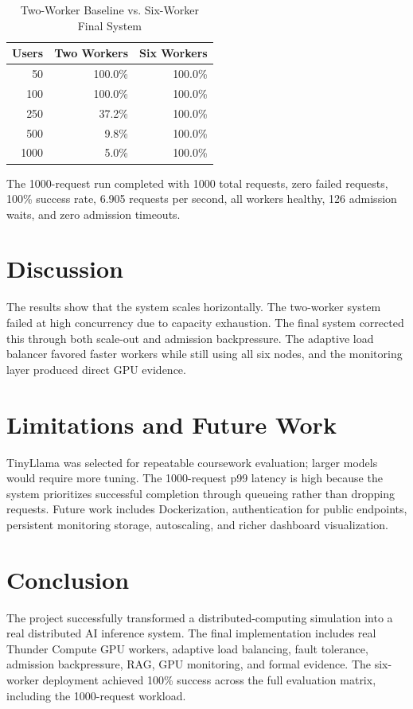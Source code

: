 \documentclass[conference]{IEEEtran}
\begin{document}
\begin{table}[h]
\caption{Two-Worker Baseline vs. Six-Worker Final System}
\centering
\begin{tabular}{rrr}
\toprule
Users & Two Workers & Six Workers \\
\midrule
50 & 100.0\% & 100.0\% \\
100 & 100.0\% & 100.0\% \\
250 & 37.2\% & 100.0\% \\
500 & 9.8\% & 100.0\% \\
1000 & 5.0\% & 100.0\% \\
\bottomrule
\end{tabular}
\end{table}

The 1000-request run completed with 1000 total requests, zero failed requests, 100\% success rate, 6.905 requests per second, all workers healthy, 126 admission waits, and zero admission timeouts.

\section{Discussion}
The results show that the system scales horizontally. The two-worker system failed at high concurrency due to capacity exhaustion. The final system corrected this through both scale-out and admission backpressure. The adaptive load balancer favored faster workers while still using all six nodes, and the monitoring layer produced direct GPU evidence.

\section{Limitations and Future Work}
TinyLlama was selected for repeatable coursework evaluation; larger models would require more tuning. The 1000-request p99 latency is high because the system prioritizes successful completion through queueing rather than dropping requests. Future work includes Dockerization, authentication for public endpoints, persistent monitoring storage, autoscaling, and richer dashboard visualization.

\section{Conclusion}
The project successfully transformed a distributed-computing simulation into a real distributed AI inference system. The final implementation includes real Thunder Compute GPU workers, adaptive load balancing, fault tolerance, admission backpressure, RAG, GPU monitoring, and formal evidence. The six-worker deployment achieved 100\% success across the full evaluation matrix, including the 1000-request workload.
\end{document}
